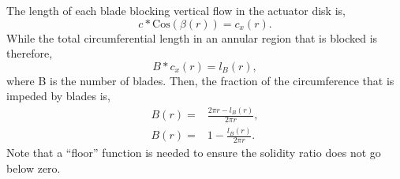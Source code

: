 







%
%



The length of each blade blocking vertical flow in the actuator disk is, 
\begin{equation}
  c * \text{Cos}(\beta(r)) = c_x(r). 
\end{equation}
While the total circumferential length in an annular region that is blocked
is therefore, 
\begin{equation}
  B * c_x(r) = l_B(r),
\end{equation}
where B is the number of blades. 
Then, the fraction of the circumference that is impeded by blades is, 
\begin{eqnarray}
 B(r) =& \frac{2\pi r- l_B(r)}{2 \pi r},\\
 B(r) =& 1- \frac{l_B(r)}{2 \pi r}. 
\end{eqnarray}
Note that a ``floor'' function is needed to ensure the solidity ratio
does not go below zero. 

